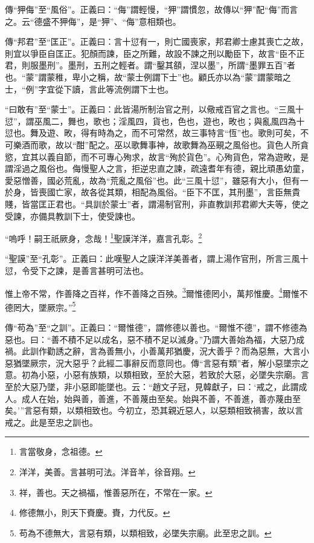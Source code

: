 {\noindent\zhuan{}\fzbyks 傳“狎侮”至“風俗”。正義曰：“侮”謂輕慢，“狎”謂慣忽，故傳以“狎”配“侮”而言之。云“德盛不狎侮”，是“狎”、“侮”意相類也。 \par}

{\noindent\zhuan{}\fzbyks 傳“邦君”至“匡正”。正義曰：言十愆有一，則亡國喪家，邦君卿士慮其喪亡之故，則宜以爭臣自匡正。犯顏而諫，臣之所難，故設不諫之刑以勵臣下，故言“臣不正君，則服墨刑”。墨刑，五刑之輕者。謂“鑿其頟，涅以墨”，所謂“墨罪五百”者也。“蒙”謂蒙稚，卑小之稱，故“蒙士例謂下士”也。顧氏亦以為“蒙”謂蒙暗之士，“例”字宜從下讀，言此等流例謂下士也。 \par}

{\noindent\shu{}\fzkt “曰敢有”至“蒙士”。正義曰：此皆湯所制治官之刑，以儆戒百官之言也。“三風十愆”，謂巫風二，舞也，歌也；淫風四，貨也，色也，遊也，畋也；與亂風四為十愆也。舞及遊、畋，得有時為之，而不可常然，故三事特言“恆”也。歌則可矣，不可樂酒而歌，故以“酣”配之。巫以歌舞事神，故歌舞為巫覡之風俗也。貨色人所貪慾，宜其以義自節，而不可專心殉求，故言“殉於貨色”。心殉貨色，常為遊畋，是謂淫過之風俗也。侮慢聖人之言，拒逆忠直之諫，疏遠耆年有德，親比頑愚幼童，愛惡憎善，國必荒亂，故為“荒亂之風俗”也。此“三風十愆”，雖惡有大小，但有一於身，皆喪國亡家，故各從其類，相配為風俗。“臣下不匡，其刑墨”，言臣無貴賤，皆當匡正君也。“具訓於蒙士”者，謂湯制官刑，非直教訓邦君卿大夫等，使之受諫，亦備具教訓下士，使受諫也。 \par}

“嗚呼！嗣王祇厥身，念哉！\footnote{言當敬身，念祖德。}聖謨洋洋，嘉言孔彰。\footnote{洋洋，美善。言甚明可法。洋音羊，徐音翔。}

{\noindent\shu{}\fzkt “聖謨”至“孔彰”。正義曰：此嘆聖人之謨洋洋美善者，謂上湯作官刑，所言三風十愆，令受下之諫，是善言甚明可法也。 \par}

惟上帝不常，作善降之百祥，作不善降之百殃。\footnote{祥，善也。天之禍福，惟善惡所在，不常在一家。}爾惟德罔小，萬邦惟慶。\footnote{修德無小，則天下賚慶。賚，力代反。}爾惟不德罔大，墜厥宗。”\footnote{苟為不德無大，言惡有類，以類相致，必墜失宗廟。此至忠之訓。}


{\noindent\zhuan{}\fzbyks 傳“苟為”至“之訓”。正義曰：“爾惟德”，謂修德以善也。“爾惟不德”，謂不修德為惡也。曰：“善不積不足以成名，惡不積不足以滅身。”乃謂大善始為福，大惡乃成禍。此訓作勸誘之辭，言為善無小，小善萬邦猶慶，況大善乎？而為惡無，大言小惡猶墜厥宗，況大惡乎？此經二事辭反而意同也。傳“言惡有類”者，解小惡墜宗之意。初為小惡，小惡有族類，以類相致，至於大惡，若致於大惡，必墜失宗廟。言至於大惡乃墜，非小惡即能墜也。云：“趙文子冠，見韓獻子，曰：‘戒之，此謂成人。成人在始，始與善，善進，不善蔑由至矣。始與不善，不善進，善亦蔑由至矣。’”言惡有類，以類相致也。今初立，恐其親近惡人，以惡類相致禍害，故以言戒之。此是至忠之訓也。 \par}

